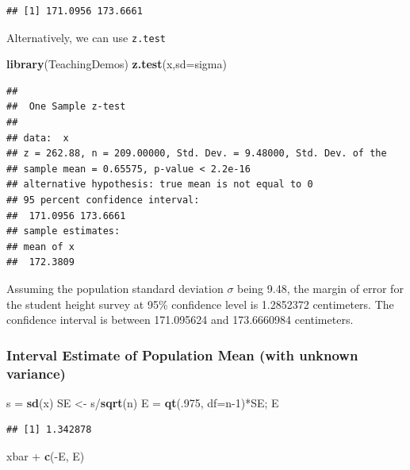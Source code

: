 \documentclass[]{article}
\newenvironment{Shaded}{\begin{snugshade}}{\end{snugshade}}
\newcommand{\KeywordTok}[1]{\textcolor[rgb]{0.13,0.29,0.53}{\textbf{{#1}}}}
\newcommand{\DataTypeTok}[1]{\textcolor[rgb]{0.13,0.29,0.53}{{#1}}}
\newcommand{\DecValTok}[1]{\textcolor[rgb]{0.00,0.00,0.81}{{#1}}}
\newcommand{\StringTok}[1]{\textcolor[rgb]{0.31,0.60,0.02}{{#1}}}
\newcommand{\NormalTok}[1]{{#1}}
\numberwithin{equation}{section}
\begin{document}
\begin{verbatim}
## [1] 171.0956 173.6661
\end{verbatim}

Alternatively, we can use \texttt{z.test}

\begin{Shaded}
\begin{Highlighting}[]
\KeywordTok{library}\NormalTok{(TeachingDemos)}
\KeywordTok{z.test}\NormalTok{(x,}\DataTypeTok{sd=}\NormalTok{sigma)}
\end{Highlighting}
\end{Shaded}

\begin{verbatim}
## 
##  One Sample z-test
## 
## data:  x
## z = 262.88, n = 209.00000, Std. Dev. = 9.48000, Std. Dev. of the
## sample mean = 0.65575, p-value < 2.2e-16
## alternative hypothesis: true mean is not equal to 0
## 95 percent confidence interval:
##  171.0956 173.6661
## sample estimates:
## mean of x 
##  172.3809
\end{verbatim}

Assuming the population standard deviation \(\sigma\) being 9.48, the
margin of error for the student height survey at 95\% confidence level
is 1.2852372 centimeters. The confidence interval is between 171.095624
and 173.6660984 centimeters.

\subsubsection{Interval Estimate of Population Mean (with unknown
variance)}\label{interval-estimate-of-population-mean-with-unknown-variance}

\begin{Shaded}
\begin{Highlighting}[]
\NormalTok{s =}\StringTok{ }\KeywordTok{sd}\NormalTok{(x)}
\NormalTok{SE <-}\StringTok{ }\NormalTok{s/}\KeywordTok{sqrt}\NormalTok{(n)}
\NormalTok{E =}\StringTok{ }\KeywordTok{qt}\NormalTok{(.}\DecValTok{975}\NormalTok{, }\DataTypeTok{df=}\NormalTok{n}\DecValTok{-1}\NormalTok{)*SE; E}
\end{Highlighting}
\end{Shaded}

\begin{verbatim}
## [1] 1.342878
\end{verbatim}

\begin{Shaded}
\begin{Highlighting}[]
\NormalTok{xbar +}\StringTok{ }\KeywordTok{c}\NormalTok{(-E, E) }
\end{Highlighting}
\end{Shaded}
\end{document}
